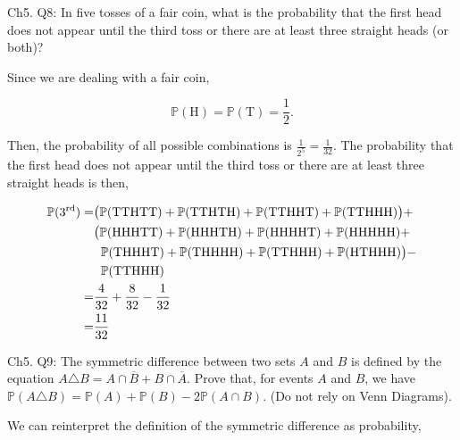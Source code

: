 \documentclass[12pt]{article}
\begin{document}
\noindent
Ch5. Q8: In five tosses of a fair coin, what is the probability that the first head does not appear until the third toss or there are at least three straight heads (or both)?

\vspace{.3cm}
\noindent
Since we are dealing with a fair coin,

\begin{equation*}
\mathbb{P}(\text{H}) = \mathbb{P}(\text{T}) = \frac{1}{2}.
\end{equation*}

\noindent
Then, the probability of all possible combinations is $\frac{1}{2^5} = \frac{1}{32}$. The probability that the first head does not appear until the third toss or there are at least three straight heads is then,

\begin{align*}
\mathbb{P}(\text{$3^{\text{rd}}$}) = & \big ( \mathbb{P}(\text{TTHTT}) + \mathbb{P}(\text{TTHTH}) + \mathbb{P}(\text{TTHHT}) + \mathbb{P}(\text{TTHHH}) \big ) + \\
& \big ( \mathbb{P}(\text{HHHTT}) + \mathbb{P}(\text{HHHTH}) + \mathbb{P}(\text{HHHHT}) + \mathbb{P}(\text{HHHHH}) + \\
& \hspace{.2cm} \mathbb{P}(\text{THHHT}) + \mathbb{P}(\text{THHHH}) + \mathbb{P}(\text{TTHHH}) + \mathbb{P}(\text{HTHHH}) \big ) - \\
& \hspace{.2cm} \mathbb{P}(\text{TTHHH}) \\
= & \frac{4}{32} + \frac{8}{32} - \frac{1}{32} \\
= & \frac{11}{32}
\end{align*}

\vspace{.5cm}

\noindent
Ch5. Q9: The symmetric difference between two sets $A$ and $B$ is defined by the equation $A \triangle B = A \cap \overline{B} + B \cap \overline{A}$. Prove that, for events $A$ and $B$, we have $\mathbb{P}(A \triangle B) = \mathbb{P}(A) + \mathbb{P}(B) - 2\mathbb{P}(A \cap B)$. (Do not rely on Venn Diagrams).

\vspace{.3cm}
\noindent
We can reinterpret the definition of the symmetric difference as probability, 
\end{document}
